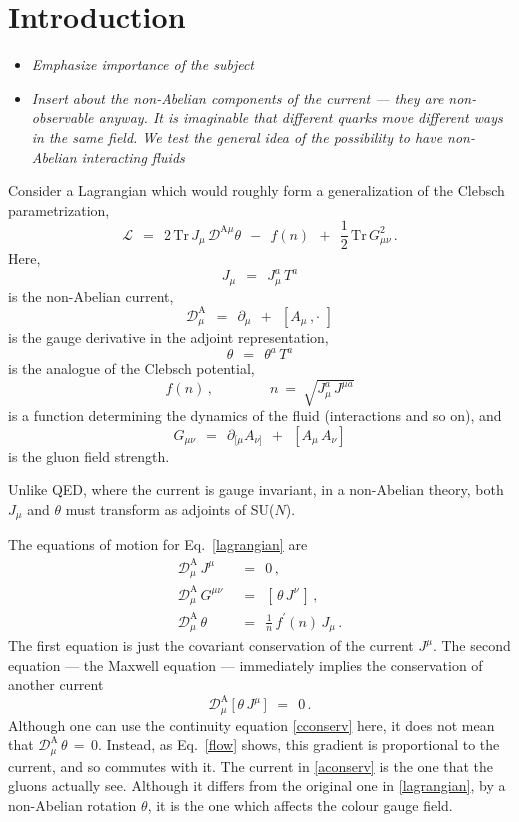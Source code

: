 \documentclass[epsfig,12pt]{article}
\def\beq{\begin{equation}}
\def\eeq{\end{equation}}
\newcommand{\p}{\partial}
\newcommand{\md}{\mathcal{D}}
\newcommand{\ml}{\mathcal{L}}
\newcommand{\Tr}{\text{Tr}}
\begin{document}
\section{Introduction}

\begin{itemize}
\item {\it Emphasize importance of the subject}

\item {\it Insert about the non-Abelian components of the current ---
	they are non-observable anyway.
	It is imaginable that different quarks move different ways
	in the same field.
	We test the general idea of the possibility to have non-Abelian interacting fluids}
\end{itemize}

\setcounter{equation}{0}

	Consider a Lagrangian which would roughly form a generalization of the Clebsch parametrization,
\beq
\label{lagrangian}
	\ml    ~~=~~    2\, \Tr\, J_\mu\,  \md^{\text{A}\mu} \theta   ~~-~~  f(n)  ~~+~~
			\frac{1}{2}\, \Tr\, G_{\mu\nu}^2\,.
\eeq
	Here,
\beq
	J_\mu    ~~=~~    J_\mu^a\, T^a
\eeq
	is the non-Abelian current,
\beq
	\md^\text{A}_\mu    ~~=~~    \p_\mu  ~~+~~  [ A_\mu\,, \cdot\,\, ]
\eeq
	is the gauge derivative in the adjoint representation,
\beq
	\theta    ~~=~~    \theta^a\, T^a
\eeq
	is the analogue of the Clebsch potential,
\beq
\label{defn}
	f(n)\,, \qquad\qquad n ~=~ \sqrt{ J_\mu^a\, J^{\mu a} }
\eeq
	is a function determining the dynamics of the fluid (interactions and so on),
	and
\beq
	G_{\mu\nu}    ~~=~~    \p_{[\mu} A_{\nu]}  ~~+~~ [ A_\mu\, A_\nu ]
\eeq
	is the gluon field strength.

	Unlike QED, where the current is gauge invariant, in a non-Abelian theory, both $ J_\mu $
	and $ \theta $ must transform as adjoints of SU($N$).

	The equations of motion for Eq.~\eqref{lagrangian} are
\begin{align}
%
\label{cconserv}
	\md^\text{A}_\mu\, J^\mu     & ~~=~~    0\,,
	\\[3.4mm]
%
\label{maxwell}
	\md^\text{A}_\mu\, G^{\mu\nu}     & ~~=~~    [\, \theta\, J^\nu \,]\,,
	\\[2mm]
%
\label{flow}
	\md^\text{A}_\mu\, \theta     & ~~=~~    \frac{1}{n}\, f^\prime(n)\, J_\mu\,.
\end{align}
	The first equation is just the covariant conservation of the current $ J^\mu $.
	The second equation --- the Maxwell equation --- immediately implies the conservation
	of another current
\beq
\label{aconserv}
	\md^\text{A}_\mu\, \big[\, \theta\, J^\mu \,\big]    ~~=~~    0\,.
\eeq
	Although one can use the continuity equation \eqref{cconserv} here, it does not mean
	that $ \md^\text{A}_\mu\, \theta  \,=\, 0 $.
	Instead, as Eq.~\eqref{flow} shows, this gradient is proportional to the current,
        and so commutes with it.
	The current in \eqref{aconserv} is the one that the gluons actually see.
	Although it differs from the original one in \eqref{lagrangian},
	by a non-Abelian rotation $ \theta $,
	it is the one which affects the colour gauge field.
\end{document}
